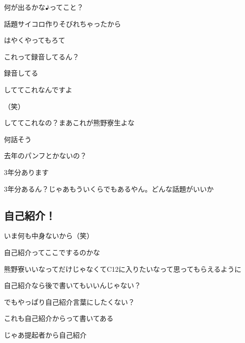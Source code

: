 \begin{multicols}{2}
  何が出るかな♪ってこと？

  話題サイコロ作りそびれちゃったから

  はやくやってもろて

  これって録音してるん？

  録音してる

  しててこれなんですよ

  （笑）

  しててこれなの？まあこれが熊野寮生よな

  何話そう

  去年のパンフとかないの？

  3年分あります

  3年分あるん？じゃあもういくらでもあるやん。どんな話題がいいか



  \subsection{自己紹介！}

  いま何も中身ないから（笑）

  自己紹介ってここでするのかな

  熊野寮いいなってだけじゃなくてC12に入りたいなって思ってもらえるように

  自己紹介なら後で書いてもいいんじゃない？

  でもやっぱり自己紹介言葉にしたくない？

  これも自己紹介からって書いてある

  じゃあ提起者から自己紹介


\end{multicols}
